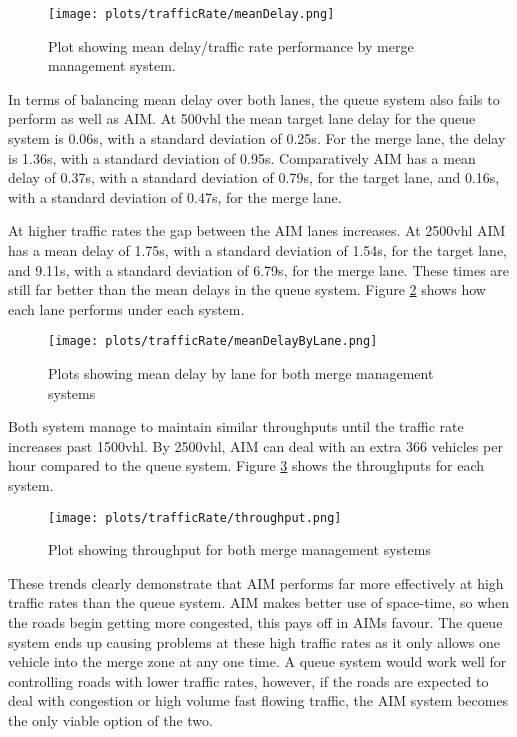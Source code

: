 \begin{figure}[htb]
\texttt{[image: plots/trafficRate/meanDelay.png]}
\caption{Plot showing mean delay/traffic rate performance by merge management system.}
\label{fig:meanDelayTrafficRate}
\end{figure}

In terms of balancing mean delay over both lanes, the queue system also fails to perform as well as AIM. At 500\si{vhl} the mean target lane delay for the queue system is 0.06\si{s}, with a standard deviation of 0.25\si{s}. For the merge lane, the delay is 1.36\si{s}, with a standard deviation of 0.95\si{s}. Comparatively AIM has a mean delay of 0.37\si{s}, with a standard deviation of 0.79\si{s}, for the target lane, and 0.16\si{s}, with a standard deviation of 0.47\si{s}, for the merge lane. 

At higher traffic rates the gap between the AIM lanes increases. At 2500\si{vhl} AIM has a mean delay of 1.75\si{s}, with a standard deviation of 1.54\si{s}, for the target lane, and 9.11\si{s}, with a standard deviation of 6.79\si{s}, for the merge lane. These times are still far better than the mean delays in the queue system. Figure \ref{fig:meanDelayByLaneTrafficRate} shows how each lane performs under each system.

\begin{figure}[htb]
\texttt{[image: plots/trafficRate/meanDelayByLane.png]}
\caption{Plots showing mean delay by lane for both merge management systems}
\label{fig:meanDelayByLaneTrafficRate}
\end{figure}

Both system manage to maintain similar throughputs until the traffic rate increases past 1500\si{vhl}. By 2500\si{vhl}, AIM can deal with an extra 366 vehicles per hour compared to the queue system. Figure \ref{fig:throughputTrafficRate} shows the throughputs for each system.

\begin{figure}[htb]
\texttt{[image: plots/trafficRate/throughput.png]}
\caption{Plot showing throughput for both merge management systems}
\label{fig:throughputTrafficRate}
\end{figure}

These trends clearly demonstrate that AIM performs far more effectively at high traffic rates than the queue system. AIM makes better use of space-time, so when the roads begin getting more congested, this pays off in AIMs favour. The queue system ends up causing problems at these high traffic rates as it only allows one vehicle into the merge zone at any one time. A queue system would work well for controlling roads with lower traffic rates, however, if the roads are expected to deal with congestion or high volume fast flowing traffic, the AIM system becomes the only viable option of the two.

